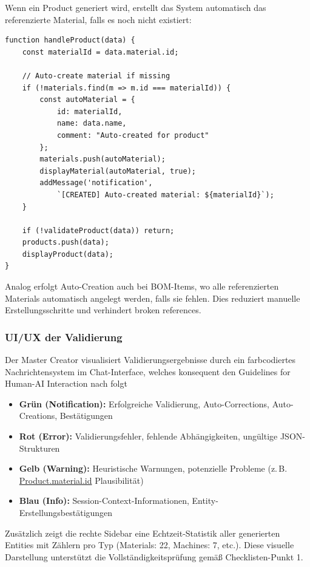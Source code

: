 Wenn ein Product generiert wird, erstellt das System automatisch das referenzierte Material, falls es noch nicht existiert:

\begin{verbatim}
function handleProduct(data) {
    const materialId = data.material.id;

    // Auto-create material if missing
    if (!materials.find(m => m.id === materialId)) {
        const autoMaterial = {
            id: materialId,
            name: data.name,
            comment: "Auto-created for product"
        };
        materials.push(autoMaterial);
        displayMaterial(autoMaterial, true);
        addMessage('notification',
            `[CREATED] Auto-created material: ${materialId}`);
    }

    if (!validateProduct(data)) return;
    products.push(data);
    displayProduct(data);
}
\end{verbatim}

\noindent Analog erfolgt Auto-Creation auch bei BOM-Items, wo alle referenzierten Materials automatisch angelegt werden, falls sie fehlen. Dies reduziert manuelle Erstellungsschritte und verhindert broken references.

\subsubsection{UI/UX der Validierung}

Der Master Creator visualisiert Validierungsergebnisse durch ein farbcodiertes Nachrichtensystem im Chat-Interface, welches konsequent den Guidelines for Human-AI Interaction nach \cite{Amershi2019} folgt

\begin{itemize}
    \item \textbf{Grün (Notification):} Erfolgreiche Validierung, Auto-Corrections, Auto-Creations, Bestätigungen
    \item \textbf{Rot (Error):} Validierungsfehler, fehlende Abhängigkeiten, ungültige JSON-Strukturen
    \item \textbf{Gelb (Warning):} Heuristische Warnungen, potenzielle Probleme (z.\,B. \url{Product.material.id} Plausibilität)
    \item \textbf{Blau (Info):} Session-Context-Informationen, Entity-Erstellungsbestätigungen
\end{itemize}

\noindent Zusätzlich zeigt die rechte Sidebar eine Echtzeit-Statistik aller generierten Entities mit Zählern pro Typ (\glqq Materials: 22\grqq{}, \glqq Machines: 7\grqq{}, etc.). Diese visuelle Darstellung unterstützt die Vollständigkeitsprüfung gemäß Checklisten-Punkt 1.

